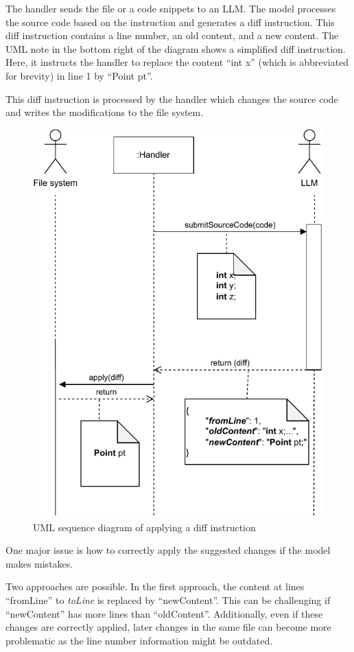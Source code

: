 The handler sends the file or a code snippets to an \ac{LLM}. The model processes the source code based on the instruction and generates a diff instruction. This diff instruction contains a line number, an old content, and a new content. The \ac{UML} note in the bottom right of the diagram shows a simplified diff instruction. Here, it instructs the handler to replace the content \enquote{int x} (which is abbreviated for brevity) in line 1 by \enquote{Point pt}. 

This diff instruction is processed by the handler which changes the source code  and writes the modifications to the file system. 
\begin{figure}[ht!]
    \centering
    \includegraphics[width=0.75\columnwidth]{figures/chapter4/sequence_diagram_piece_output.drawio.pdf}
    \caption{\ac{UML} sequence diagram of applying a diff instruction}
    \label{fig:json_based_changes}
\end{figure}





One major issue is how to correctly apply the suggested changes if the model makes mistakes. 

Two approaches are possible.
In the first approach, the content at lines \enquote{fromLine} to \textit{toLine} is replaced by \enquote{newContent}. This can be challenging if \enquote{newContent} has more lines than \enquote{oldContent}. Additionally, even if these  changes are correctly applied, later changes in the same file can become more problematic as the line number information might be outdated. 

